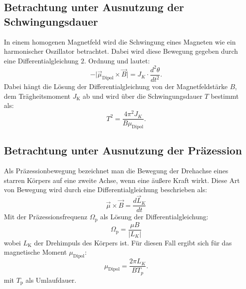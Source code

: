 \subsection{Betrachtung unter Ausnutzung der Schwingungsdauer}
In einem homogenen Magnetfeld wird die Schwingung eines Magneten wie ein harmonischer Oszillator betrachtet. Dabei wird diese Bewegung gegeben durch eine Differentialgleichung $2$. Ordnung und lautet:
\begin{equation}
-\vert\vec{\mu}_{\text{Dipol}}\times\vec{B}\vert = J_{K} \cdot \frac{d^{2}\theta}{dt^{2}}.
\end{equation} 
Dabei hängt die Lösung der Differentialgleichung von der Magnetfeldstärke $B$, dem Trägheitsmoment $J_{\text{K}}$ ab und wird über die Schwingungsdauer $T$ bestimmt als:
\begin{equation}
T^{2}=\frac{4\pi^{2}J_{K}}{B\mu_{\text{Dipol}}}.
\label{eq:Schwingungsdauer}
\end{equation}
\subsection{Betrachtung unter Ausnutzung der Präzession}
Als Präzessionbewegung bezeichnet man die Bewegung der Drehachse eines starren Körpers auf eine zweite Achse, wenn eine äußere Kraft wirkt. Diese Art von Bewegung wird durch eine Differentialgleichung beschrieben als:
\begin{equation}
\vec{\mu} \times \vec{B} = \frac{d\vec{L}_{K}}{dt}
\end{equation}  
Mit der Präzessionsfrequenz $\Omega_{\text{p}}$ als Lösung der Differentialgleichung:
\begin{equation}
\Omega_{\text{p}}=\frac{\mu B}{\vert L_{K} \vert}
\end{equation}
wobei $L_{\text{K}}$ der Drehimpuls des Körpers ist.
Für diesen Fall ergibt sich für das magnetische Moment $\mu_{\text{Dipol}}$:
\begin{equation}
\mu_{\text{Dipol}}=\frac{2\pi L_{K}}{BT_{p}}.
\label{eq:Präzession}
\end{equation}
mit $T_{\text{p}}$ als Umlaufdauer.
